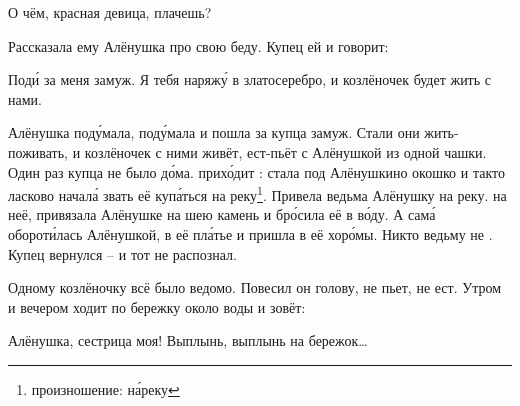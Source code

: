 %
\begin{dialogue}
    \item О чём, красная девица, плачешь?
\end{dialogue}
Рассказала ему Алёнушка про свою беду. Купец ей и говорит:
\begin{dialogue}
    \item Под\'{и} за меня замуж. Я тебя наряж\'{у} в златосеребро, и козлёночек будет жить с нами.
\end{dialogue}
Алёнушка под\'{у}мала, под\'{у}мала и пошла за купца замуж. Стали они жить-поживать, и козлёночек с ними живёт, ест-пьёт с Алёнушкой из одной чашки. Один раз купца не было д\'{о}ма.  прих\'{о}дит : стала под Алёнушкино окошко и такто ласково начал\'{а} звать её куп\'{а}ться на реку\footnote{произношение: н\'{а}реку}. Привела ведьма Алёнушку на реку.  на неё, привязала Алёнушке на шею камень и бр\'{о}сила её в в\'{о}ду. А сам\'{а} оборот\'{и}лась Алёнушкой,  в её пл\'{а}тье и пришла в её хор\'{о}мы. Никто ведьму не . Купец вернулся -- и тот не распознал.

Одному козлёночку всё было ведомо. Повесил он голову, не пьет, не ест. Утром и вечером ходит по бережку около воды и зовёт:
\begin{dialogue}
    \item Алёнушка, сестрица моя! Выплынь, выплынь на бережок\dots
\end{dialogue}

